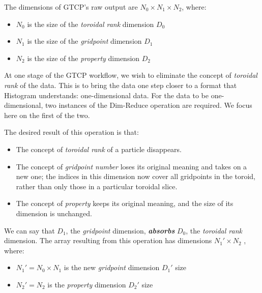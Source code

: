 The dimensions of GTCP's raw output are 
$N_0{\times}N_1{\times}N_2$, where:

\begin{itemize}

\item $N_0$ is the size of the {\em toroidal rank} dimension $D_0$

\item $N_1$ is the size of the {\em gridpoint} dimension $D_1$

\item $N_2$ is the size of the {\em property} dimension $D_2$

\end{itemize}

At one stage of the GTCP workflow, we wish
to eliminate the concept of
{\em toroidal rank} of the data. This is to bring the data one step
closer to a format that Histogram understands:
one-dimensional data.
For the data to be one-dimensional, two instances of the
Dim-Reduce operation are required.
We focus here on the first of the two.

The desired result of this operation is that:

\begin{itemize}

\item The concept of {\em toroidal rank} of a particle disappears.

\item The concept of {\em gridpoint number} loses its
  original meaning and takes
  on a new one; the indices in this dimension now
  cover all gridpoints in the toroid,
  rather than only those in a particular toroidal slice.
  
\item The concept of {\em property} keeps its original
  meaning, and the size of its dimension is unchanged.

\end{itemize}

We can say that $D_1$, the {\em gridpoint} dimension,
\textbf{\em absorbs} $D_0$, the {\em toroidal rank} dimension.
The array resulting from this
operation has dimensions $N_1'{\times}N_2$ , where:

\begin{itemize}

\item $N_1' = N_0{\times}N_1$ is the new {\em gridpoint} dimension $D_1'$ size

\item $N_2' = N_2$ is the {\em property} dimension $D_2'$ size

\end{itemize}

